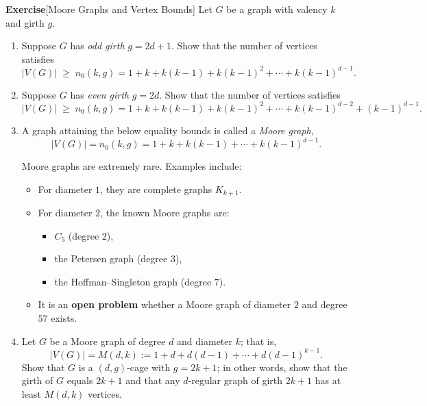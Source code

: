 \documentclass[12pt,a4paper,openany]{book}
\begin{document}
\bigskip

\noindent\textbf{Exercise}[Moore Graphs and Vertex Bounds]
Let $G$ be a graph with valency $k$ and girth $g$.

\begin{enumerate}
    \item Suppose $G$ has \emph{odd girth} $g = 2d + 1$. Show that the number of vertices satisfies
    \[
    |V(G)| \;\ge\; n_0(k,g) = 1 + k + k(k-1) + k(k-1)^2 + \cdots + k(k-1)^{d-1}.
    \]

    \item Suppose $G$ has \emph{even girth} $g = 2d$. Show that the number of vertices satisfies
    \[
    |V(G)| \;\ge\; n_0(k,g) = 1 + k + k(k-1) + k(k-1)^2 + \cdots + k(k-1)^{d-2} + (k-1)^{d-1}.
    \]

    \item  A graph attaining the below equality bounds is called a \emph{Moore graph},
    \[
    |V(G)| = n_0(k,g) = 1 + k + k(k-1) + \cdots + k(k-1)^{d-1}.
    \] 
    
    Moore graphs are extremely rare. Examples include:
    \begin{itemize}
        \item For diameter $1$, they are complete graphs $K_{k+1}$.
        \item For diameter $2$, the known Moore graphs are:
        \begin{itemize}
            \item $C_5$ (degree $2$),
            \item the Petersen graph (degree $3$),
            \item the Hoffman–Singleton graph (degree $7$).
        \end{itemize}
        \item It is an \textbf{open problem} whether a Moore graph of diameter $2$ and degree $57$ exists.
    \end{itemize}

\item Let \(G\) be a Moore graph of degree \(d\) and diameter \(k\); that is,
\[
|V(G)|=M(d,k):=1+d+d(d-1)+\cdots+d(d-1)^{k-1}.
\]
Show that \(G\) is a \((d,g)\)-cage with \(g=2k+1\); in other words, show that the girth of \(G\) equals \(2k+1\) and that any \(d\)-regular graph of girth \(2k+1\) has at least \(M(d,k)\) vertices.

\bigskip



\end{enumerate}
\end{document}
